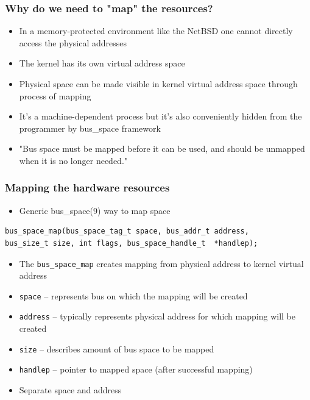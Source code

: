 \documentclass[dvipsnames,table]{beamer}
\begin{document}
\begin{frame}
\frametitle{Why do we need to "map" the resources?}
\begin{itemize}
	\item In a memory-protected environment like the NetBSD one cannot directly access the physical addresses
	\item The kernel has its own virtual address space
    \item Physical space can be made visible in kernel virtual address space through process of mapping
    \item It's a machine-dependent process but it's also conveniently hidden from the programmer by bus\_space framework
    \item "Bus space must be mapped before it can be used, and should be unmapped
     when it is no longer needed."
\end{itemize}
\end{frame}


\begin{frame}[fragile]
\frametitle{Mapping the hardware resources}

\begin{itemize}
	\item Generic bus\_space(9) way to map space
\end{itemize}

\begin{verbatim}
bus_space_map(bus_space_tag_t space, bus_addr_t address, 
bus_size_t size, int flags, bus_space_handle_t  *handlep);
\end{verbatim}

\begin{itemize}
	\item The {\tt bus\_space\_map} creates mapping from physical address to kernel virtual address
    \item {\tt space} -- represents bus on which the mapping will be created
    \item {\tt address} -- typically represents physical address for which mapping will be created
	\item {\tt size} -- describes amount of bus space to be mapped
	\item {\tt handlep} -- pointer to mapped space (after successful mapping)
    \item Separate space and address
\end{itemize}
\end{frame}
\end{document}
